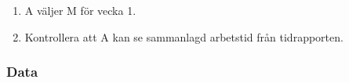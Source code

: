 \documentclass[a4paper]{article}
\def\reqinside{\hfil\penalty 100 \hfilneg \hbox}
\def \req [#1]{\reqinside{[SRS krav #1]}}
\begin{document}
\begin{FT}
\begin{enumerate}
\item A väljer M för vecka 1.
\item Kontrollera att A kan se sammanlagd arbetstid från tidrapporten.
\end{enumerate}






\end{FT}


\subsubsection{Data}
\end{document}
